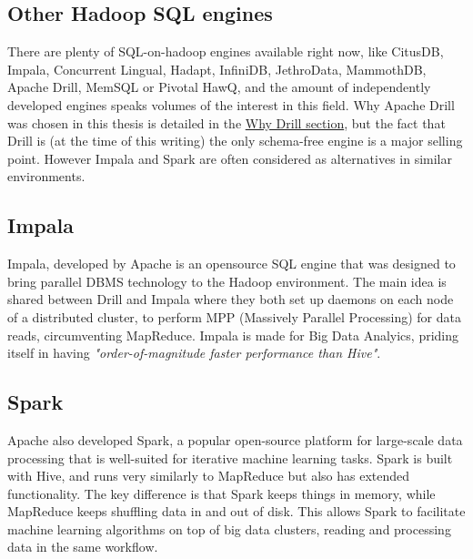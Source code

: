 \documentclass[a4paper,english]{report}
\begin{document}
		\subsection{Other Hadoop SQL engines}
		There are plenty of SQL-on-hadoop engines available right now, like CitusDB, Impala, Concurrent Lingual, Hadapt, InfiniDB, JethroData, MammothDB, Apache Drill, MemSQL or Pivotal HawQ, and the amount of independently developed engines speaks volumes of the interest in this field. Why Apache Drill was chosen in this thesis is detailed in the \hyperref[sec:why_drill]{Why Drill section}, but the fact that Drill is (at the time of this writing) the only schema-free engine is a major selling point. However Impala and Spark are often considered as alternatives in similar environments.
			\subsection{Impala}
			Impala, developed by Apache is an opensource SQL engine that was designed to bring parallel DBMS technology to the Hadoop environment\cite{impala}. The main idea is shared between Drill and Impala where they both set up daemons on each node of a distributed cluster, to perform MPP (Massively Parallel Processing) for data reads, circumventing MapReduce. Impala is made for Big Data Analyics, priding itself in having \textit{"order-of-magnitude faster performance than Hive"}\cite{impalasite}.
			\subsection{Spark}
			Apache also developed Spark, a popular open-source platform for large-scale data processing that is	well-suited for iterative machine learning tasks\cite{spark_ml}. Spark is built with Hive, and runs very similarly to MapReduce but also has extended functionality. The key difference is that Spark keeps things in memory, while MapReduce keeps shuffling data in and out of disk. This allows Spark to facilitate machine learning algorithms on top of big data clusters, reading and processing data in the same workflow.
			
\end{document}
